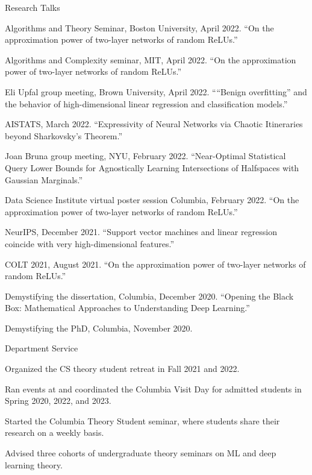 \documentclass{cv} %
\begin{document}
\begin{rSection}{Research Talks}
\begin{rSubsection}{}{}{}
\item Algorithms and Theory Seminar, Boston University, April 2022. ``On the approximation power of two-layer networks of random ReLUs.'' 
\item Algorithms and Complexity seminar, MIT, April 2022. ``On the approximation power of two-layer networks of random ReLUs.'' 
\item Eli Upfal group meeting, Brown University, April 2022. ``“Benign overfitting” and the behavior of high-dimensional linear regression and classification models.''
\item AISTATS, March 2022. ``Expressivity of Neural Networks via Chaotic Itineraries beyond Sharkovsky's Theorem.'' 
\item  Joan Bruna group meeting, NYU, February 2022. ``Near-Optimal Statistical Query Lower Bounds for Agnostically Learning Intersections of Halfspaces with Gaussian Marginals.''
\item  Data Science Institute virtual poster session Columbia, February 2022. ``On the approximation power of two-layer networks of random ReLUs.''
\item  NeurIPS, December 2021. ``Support vector machines and linear regression coincide with very high-dimensional features.''
\item COLT 2021, August 2021.  ``On the approximation power of two-layer networks of random ReLUs.''
\item Demystifying the dissertation, Columbia, December 2020. ``Opening the Black Box: Mathematical Approaches to Understanding Deep Learning.''
\item Demystifying the PhD, Columbia, November 2020. 

\end{rSubsection}
\end{rSection}

\begin{rSection}{Department Service}
\begin{rSubsection}{}{}{}

    \item Organized the CS theory student retreat in Fall 2021 and 2022.
    \item Ran events at and coordinated the Columbia Visit Day for admitted students in Spring 2020, 2022, and 2023.
    \item Started the Columbia Theory Student seminar, where students share their research on a weekly basis.
    \item Advised three cohorts of undergraduate theory seminars on ML and deep learning theory.
\end{rSubsection}
\end{rSection}
\end{document}
